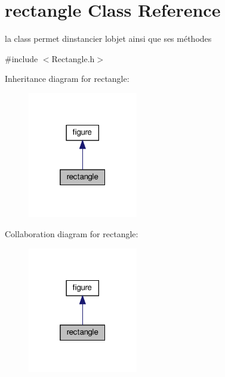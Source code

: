 \hypertarget{classrectangle}{}\section{rectangle Class Reference}
\label{classrectangle}


la class permet d\textquotesingle{}instancier l\textquotesingle{}objet ainsi que ses méthodes  




{\ttfamily \#include $<$Rectangle.\+h$>$}



Inheritance diagram for rectangle\+:
\nopagebreak
\begin{figure}[H]
\begin{center}
\leavevmode
\includegraphics[width=136pt]{classrectangle__inherit__graph}
\end{center}
\end{figure}


Collaboration diagram for rectangle\+:
\nopagebreak
\begin{figure}[H]
\begin{center}
\leavevmode
\includegraphics[width=136pt]{classrectangle__coll__graph}
\end{center}
\end{figure}
